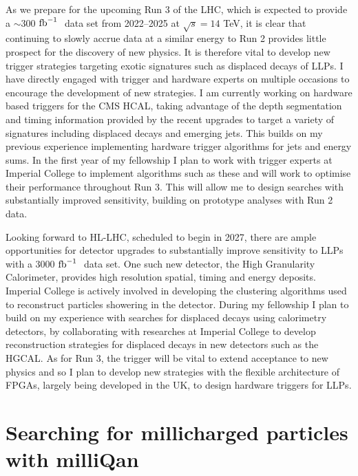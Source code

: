 \documentclass[11pt,twocolumn]{article}
\theoremstyle{plain} \numberwithin{equation}{section}
\theoremstyle{definition}
\DeclareRobustCommand{\ifb}{$\rm{fb}^{-1}~$}
\begin{document}
As we prepare for the upcoming Run 3 of the LHC, which is expected to provide a $\sim 300$ \ifb
data set from 2022--2025 at $\sqrt{s} = 14$ TeV, it is clear that continuing to slowly accrue
data at a similar energy to Run 2 provides little prospect for the discovery of new physics.
It is therefore vital to develop new trigger strategies targeting exotic signatures
such as displaced decays of LLPs. I have directly engaged with trigger and hardware experts 
on multiple occasions to encourage the development of new strategies. 
I am currently working on hardware based 
triggers for the CMS HCAL, taking advantage of the depth segmentation and timing 
information provided by the recent upgrades to target a variety of signatures including displaced
decays and emerging jets. This builds on my previous experience 
implementing hardware trigger algorithms for jets and energy sums. 
In the first year of my fellowship I plan to
work with trigger experts at Imperial College to implement algorithms such as these
and will work to optimise their performance throughout Run 3. This will allow me to design 
searches with substantially improved sensitivity, building 
on prototype analyses with Run 2 data.

Looking forward to HL-LHC, scheduled to begin in 2027, there are ample opportunities
for detector upgrades to substantially improve sensitivity to LLPs with a 3000 \ifb
data set. One such new detector, the High Granularity Calorimeter, 
provides high resolution spatial, timing and energy deposits. Imperial College is actively involved in 
developing the clustering algorithms used to reconstruct particles showering in the detector. 
During my fellowship I plan to build on my experience with searches for 
displaced decays using calorimetry detectors, by collaborating with researches at Imperial College
to develop reconstruction strategies for displaced decays in new detectors such as the HGCAL.
As for Run 3, the trigger will be vital to extend acceptance to new physics and so I plan
to develop new strategies with the flexible architecture of FPGAs, largely being developed in 
the UK, to design hardware triggers for LLPs.

\section*{Searching for millicharged particles with milliQan}
\end{document}
